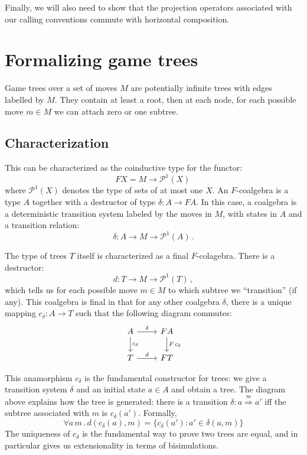 \documentclass[11pt]{article}
\begin{document}
Finally, we will also need to show that the projection operators
associated with our calling conventions
commute with horizontal composition.

\section{Formalizing game trees}

Game trees over a set of moves $M$
are potentially infinite trees with
edges labelled by $M$.
They contain at least a root,
then at each node,
for each possible move $m \in M$
we can attach zero or one subtree.

\subsection{Characterization}

This can be characterized as the coinductive type for the functor:
\[ F X = M \rightarrow \mathcal{P}^1(X)\, \]
where $\mathcal{P}^1(X)$ denotes the type of sets of at most one $X$.
An $F$-coalgebra is a type $A$
together with a destructor of type $\delta : A \rightarrow F A$.
In this case, a coalgebra is a deterministic transition system
labeled by the moves in $M$,
with states in $A$ and a transition relation:
\[ \delta : A \rightarrow M \rightarrow \mathcal{P}^1(A) \, . \]

The type of trees $T$ itself is characterized as a final $F$-colagebra.
There is a destructor:
\[ d : T \rightarrow M \rightarrow \mathcal{P}^1(T) \, , \]
which tells us for each possible move $m \in M$
to which subtree we ``transition'' (if any).
This coalgebra is final in that for any other coalgebra $\delta$,
there is a unique mapping $c_{\delta} : A \rightarrow T$
such that the following diagram commutes:
\[
  \begin{tikzcd}
    A \arrow[r, "\delta"]
      \arrow[d, "c_{\delta}"] &
    F A \arrow[d, "F \, c_\delta"] \\
    T \arrow[r, "d"] &
    F T
  \end{tikzcd}
\]

This anamorphism $c_\delta$ is
the fundamental constructor for trees:
we give a transition system $\delta$ and an initial state $a \in A$
and obtain a tree.
The diagram above explains how the tree is generated:
there is a transition $\delta : a \stackrel{m}{\Longrightarrow} a'$ iff
the subtree associated with $m$ is $c_{\delta}(a')$.
Formally,
\[
  \forall a \, m \,.\,
    d(c_{\delta}(a), m) = \{ c_{\delta}(a') : a' \in \delta(a, m) \}
\]
The uniqueness of $c_\delta$ is
the fundamental way to prove two trees are equal,
and in particular gives us extensionality
in terms of bisimulations.
\end{document}
